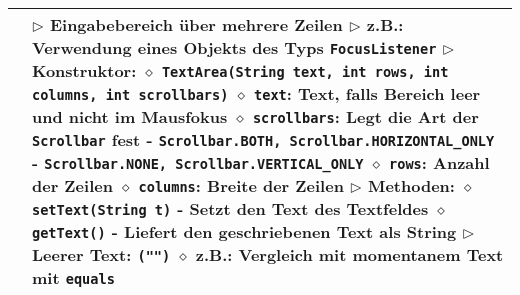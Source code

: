 \begin{longtable}{ | p{} p{} | }
	\makecell[l]{Klasse TextArea} & \makecell[l]{
	$\rhd$ Eingabebereich über mehrere Zeilen \\
	$\rhd$ z.B.: Verwendung eines Objekts des Typs \texttt{FocusListener} \\
	$\rhd$ Konstruktor: \\
	\hspace{0.4cm} $\diamond$ \texttt{TextArea(String text, int rows, int columns, int scrollbars)} \\
	\hspace{0.4cm} $\diamond$ \texttt{text}: Text, falls Bereich leer und nicht im Mausfokus \\
	\hspace{0.4cm} $\diamond$ \texttt{scrollbars}: Legt die Art der \texttt{Scrollbar} fest \\
	\hspace{0.6cm} - \texttt{Scrollbar.BOTH, Scrollbar.HORIZONTAL\_ONLY} \\
	\hspace{0.6cm} - \texttt{Scrollbar.NONE, Scrollbar.VERTICAL\_ONLY} \\
	\hspace{0.4cm} $\diamond$ \texttt{rows}: Anzahl der Zeilen \\
	\hspace{0.4cm} $\diamond$ \texttt{columns}: Breite der Zeilen \\
	$\rhd$ Methoden: \\
	\hspace{0.4cm} $\diamond$ \texttt{setText(String t)} \\
	\hspace{0.6cm} - Setzt den Text des Textfeldes \\
	\hspace{0.4cm} $\diamond$ \texttt{getText()} \\
	\hspace{0.6cm} - Liefert den geschriebenen Text als String \\
	$\rhd$ Leerer Text: \texttt{(\string"\string")} \\
	\hspace{0.4cm} $\diamond$ z.B.: Vergleich mit momentanem Text mit \texttt{equals}} \\ \hline


\end{longtable}
